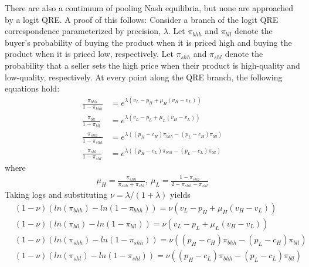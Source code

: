 \documentclass[12pt]{article}
\begin{document}
There are also a continuum of pooling Nash equilibria, but none are approached by a logit QRE. A proof of this follows: Consider a branch of the logit QRE correspondence parameterized by precision, $\lambda$. Let $\pi_{bhh}$ and $\pi_{bll}$ denote the buyer's probability of buying the product when it is priced high and buying the product when it is priced low, respectively. Let $\pi_{shh}$ and $\pi_{shl}$ denote the probability that a seller sets the high price when their product is high-quality and low-quality, respectively. At every point along the QRE branch, the following equations hold:
\begin{align*}
\frac{\pi_{bhh}}{1 - \pi_{bhh}} &= e^{\lambda \left(v_L - p_H + \mu_H (v_H - v_L) \right)} \\
\frac{\pi_{bll}}{1 - \pi_{bll}} &= e^{\lambda \left(v_L - p_L + \mu_L (v_H - v_L) \right)} \\
\frac{\pi_{shh}}{1 - \pi_{shh}} &= e^{\lambda \left( (p_H - c_H) \pi_{bhh} - (p_L - c_H) \pi_{bll} \right)} \\
\frac{\pi_{shl}}{1 - \pi_{shl}} &= e^{\lambda \left( (p_H - c_L) \pi_{bhh} - (p_L - c_L) \pi_{bll} \right)}
\end{align*}
where
\begin{align*}
\mu_H = \frac{\pi_{shh}}{\pi_{shh} + \pi_{shl}} , \ \mu_L = \frac{1 - \pi_{shh}}{2 - \pi_{shh} - \pi_{shl}}
\end{align*}
Taking logs and substituting $\nu = \lambda / (1 + \lambda)$ yields
\begin{align}
&(1 - \nu) \left( ln \left( \pi_{bhh} \right) - ln \left( 1 - \pi_{bhh} \right) \right) = \nu \left( v_L - p_H + \mu_H (v_H - v_L) \right) \label{eq:bhh_1s} \\
&(1 - \nu) \left( ln \left( \pi_{bll} \right) - ln \left( 1 - \pi_{bll} \right) \right) = \nu \left( v_L - p_L + \mu_L (v_H - v_L) \right) \label{eq:bll_1s} \\
&(1 - \nu) \left( ln \left( \pi_{shh} \right) - ln \left( 1 - \pi_{shh} \right) \right) = \nu \left( (p_H - c_H) \pi_{bhh} - (p_L - c_H) \pi_{bll} \right) \label{eq:shh_1s} \\
&(1 - \nu) \left( ln \left( \pi_{shl} \right) - ln \left( 1 - \pi_{shl} \right) \right) = \nu \left( (p_H - c_L) \pi_{bhh} - (p_L - c_L) \pi_{bll} \right) \label{eq:shl_1s}
\end{align}
\end{document}
